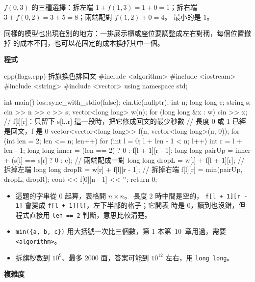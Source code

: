 $f(0, 3)$ 的三種選擇：拆左端 $1 + f(1, 3) = 1 + 0 = 1$；拆右端
$3 + f(0, 2) = 3 + 5 = 8$；兩端配對 $f(1, 2) + 0 = 4$。 最小的是 $1$。

同樣的模型也出現在別的地方：一排展示櫃或座位要調整成左右對稱，每個位置撤掉
的成本不同，也可以花固定的成本換掉其中一個。

\textbf{程式}

\begin{example}[label=ex:ivdp-flags]{cpp}{(flags.cpp) 拆旗換色排回文}
#include <algorithm>
#include <iostream>
#include <string>
#include <vector>
using namespace std;

int main() {
    ios::sync_with_stdio(false);
    cin.tie(nullptr);
    int n;
    long long c;
    string s;
    cin >> n >> c >> s;
    vector<long long> w(n);
    for (long long &x : w) {
        cin >> x;
    }
    // f[l][r]：只留下 s[l..r] 這一段時，把它修成回文的最少秒數
    // 長度 0 或 1 已經是回文，f 是 0
    vector<vector<long long>> f(n, vector<long long>(n, 0));
    for (int len = 2; len <= n; len++) {
        for (int l = 0; l + len - 1 < n; l++) {
            int r = l + len - 1;
            long long inner = (len == 2) ? 0 : f[l + 1][r - 1];
            long long pairUp = inner + (s[l] == s[r] ? 0 : c);   // 兩端配成一對
            long long dropL = w[l] + f[l + 1][r];                 // 拆掉左端
            long long dropR = w[r] + f[l][r - 1];                 // 拆掉右端
            f[l][r] = min({pairUp, dropL, dropR});
        }
    }
    cout << f[0][n - 1] << '\n';
    return 0;
}
\end{example}


\begin{itemize}
\item 這題的字串從 $0$ 起算，表格開 $n \times n$。 長度 $2$ 時中間是空的，
\texttt{f[l + 1][r - 1]} 會變成 \texttt{f[l + 1][l]}，左下半部的格子；它開表
時是 $0$，讀到也沒錯，但程式直接用 \texttt{len == 2} 判斷，意思比較清楚。
\item \texttt{min(\{a, b, c\})} 用大括號一次比三個數，第 1 本第~10~章用過，需要
\texttt{<algorithm>}。
\item 拆旗秒數到 $10^9$、最多 $2000$ 面，答案可能到 $10^{12}$ 左右，用
\texttt{long long}。
\end{itemize}

\textbf{複雜度}

